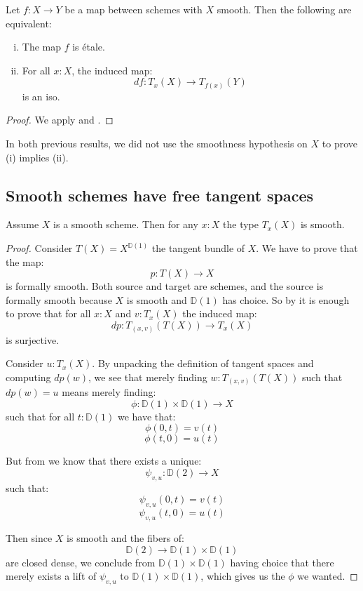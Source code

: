 \begin{corollary}\label{etale-schemes-iff-local-iso}
Let $f:X\to Y$ be a map between schemes with $X$ smooth. Then the following are equivalent:
\begin{enumerate}[(i)]
\item The map $f$ is étale. 
\item For all $x:X$, the induced map:
\[df : T_x(X)\to T_{f(x)}(Y)\]
is an iso.
\end{enumerate}
\end{corollary}

\begin{proof}
We apply  and .
\end{proof}

\begin{remark}\label{smooth-maps-are-submersions}
In both previous results, we did not use the smoothness hypothesis on $X$ to prove (i) implies (ii).
\end{remark}

\subsection{Smooth schemes have free tangent spaces}

\begin{lemma}\label{smooth-implies-smooth-tangent}
Assume $X$ is a smooth scheme. Then for any $x:X$ the type $T_x(X)$ is smooth.
\end{lemma}

\begin{proof}
Consider $T(X) = X^{\mathbb{D}(1)}$ the tangent bundle of $X$. We have to prove that the map:
\[p:T(X)\to X\]
is formally smooth. Both source and target are schemes, and the source is formally smooth because $X$ is smooth and $\mathbb{D}(1)$ has choice. So by  it is enough to prove that for all $x:X$ and $v:T_x(X)$ the induced map:
\[dp:T_{(x,v)}(T(X))\to T_x(X)\]
is surjective. 

Consider $u:T_x(X)$. By unpacking the definition of tangent spaces and computing $dp(w)$, we see that merely finding $w:T_{(x,v)}(T(X))$ such that $dp(w) = u$ means merely finding:
\[\phi : \mathbb{D}(1) \times \mathbb{D}(1) \to X\]
such that for all $t:\mathbb{D}(1)$ we have that:
\[\phi(0,t) = v(t)\]
\[\phi(t,0) = u(t)\]

But from  we know that there exists a unique:
\[\psi_{v,u} : \mathbb{D}(2)\to X\]
such that:
\[\psi_{v,u}(0,t) = v(t)\]
\[\psi_{v,u}(t,0) = u(t)\]

Then since $X$ is smooth and the fibers of:
\[\mathbb{D}(2) \to\mathbb{D}(1) \times \mathbb{D}(1) \]
are closed dense, we conclude from $\mathbb{D}(1) \times \mathbb{D}(1)$ having choice that there merely exists a lift of $\psi_{v,u}$ to $\mathbb{D}(1) \times \mathbb{D}(1)$, which gives us the $\phi$ we wanted.
\end{proof}

